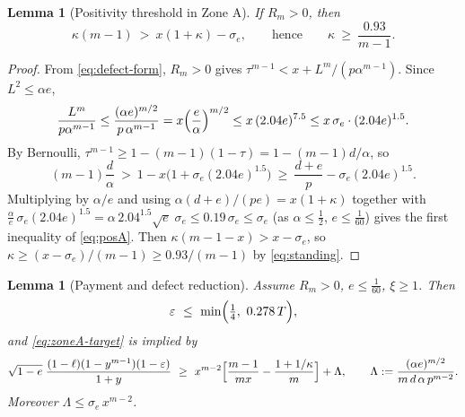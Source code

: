 \documentclass[11pt]{article}
\newtheorem{lemma}[theorem]{Lemma}
\newcommand{\eps}{\varepsilon}
\begin{document}
\begin{lemma}[Positivity threshold in Zone A]\label{lem:posA}
If $R_m>0$, then
\begin{equation}\label{eq:posA}
        \kappa(m-1)\ >\ x(1+\kappa)-\sigma_e,
        \qquad\text{hence}\qquad
        \kappa\ \ge\ \frac{0.93}{m-1}.
\end{equation}
\end{lemma}

\begin{proof}
From \eqref{eq:defect-form}, $R_m>0$ gives
$\tau^{m-1}<x+L^m/(p\alpha^{m-1})$.  Since $L^2\le\alpha e$,
\[
        \frac{L^m}{p\alpha^{m-1}}
        \le\frac{(\alpha e)^{m/2}}{p\,\alpha^{m-1}}
        =x\Bigl(\frac e\alpha\Bigr)^{m/2}
        \le x\,(2.04e)^{7.5}\le x\,\sigma_e\cdot(2.04e)^{1.5} .
\]
By Bernoulli, $\tau^{m-1}\ge1-(m-1)(1-\tau)=1-(m-1)d/\alpha$, so
\[
        (m-1)\frac d\alpha\ >\ 1-x\bigl(1+\sigma_e(2.04e)^{1.5}\bigr)
        \ \ge\ \frac{d+e}{p}-\sigma_e(2.04e)^{1.5}.
\]
Multiplying by $\alpha/e$ and using $\alpha(d+e)/(pe)=x(1+\kappa)$ together
with $\frac\alpha e\,\sigma_e(2.04e)^{1.5}
=\alpha\,2.04^{1.5}\sqrt e\;\sigma_e\le0.19\,\sigma_e\le\sigma_e$
(as $\alpha\le\tfrac12$, $e\le\tfrac1{60}$)
gives the first inequality of \eqref{eq:posA}.  Then
$\kappa(m-1-x)>x-\sigma_e$, so
$\kappa\ge(x-\sigma_e)/(m-1)\ge0.93/(m-1)$ by \eqref{eq:standing}.
\end{proof}

\begin{lemma}[Payment and defect reduction]\label{lem:reduceA}
Assume $R_m>0$, $e\le\tfrac1{60}$, $\xi\ge1$.  Then
\begin{equation}\label{eq:epsA}
        \eps\ \le\ \min\Bigl(\tfrac14,\ 0.278\,T\Bigr),
\end{equation}
and \eqref{eq:zoneA-target} is implied by
\begin{equation}\label{eq:reducedA}
        \sqrt{1-e}\;\frac{(1-\ell)(1-y^{m-1})(1-\eps)}{1+y}
        \ \ge\
        x^{m-2}\Bigl[\frac{m-1}{mx}-\frac{1+1/\kappa}{m}\Bigr]
        +\Lambda,
        \qquad
        \Lambda:=\frac{(\alpha e)^{m/2}}{m\,d\,\alpha\,p^{m-2}} .
\end{equation}
Moreover $\Lambda\le\sigma_e\,x^{m-2}$.
\end{lemma}
\end{document}
